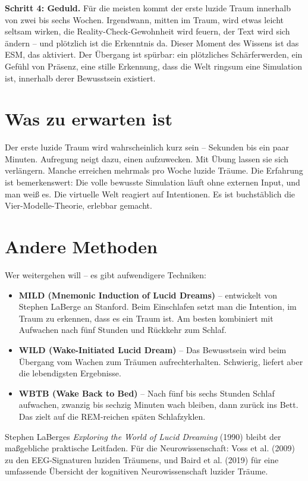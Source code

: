 \documentclass[11pt, twoside, openright]{book}
\begin{document}
\textbf{Schritt 4: Geduld.} Für die meisten kommt der erste luzide Traum innerhalb von zwei bis sechs Wochen. Irgendwann, mitten im Traum, wird etwas leicht seltsam wirken, die Reality-Check-Gewohnheit wird feuern, der Text wird sich ändern -- und plötzlich ist die Erkenntnis da. Dieser Moment des Wissens ist das ESM, das aktiviert. Der Übergang ist spürbar: ein plötzliches Schärferwerden, ein Gefühl von Präsenz, eine stille Erkennung, dass die Welt ringsum eine Simulation ist, innerhalb derer Bewusstsein existiert.

\section*{Was zu erwarten ist}

Der erste luzide Traum wird wahrscheinlich kurz sein -- Sekunden bis ein paar Minuten. Aufregung neigt dazu, einen aufzuwecken. Mit Übung lassen sie sich verlängern. Manche erreichen mehrmals pro Woche luzide Träume. Die Erfahrung ist bemerkenswert: Die volle bewusste Simulation läuft ohne externen Input, und man weiß es. Die virtuelle Welt reagiert auf Intentionen. Es ist buchstäblich die Vier-Modelle-Theorie, erlebbar gemacht.

\section*{Andere Methoden}

Wer weitergehen will -- es gibt aufwendigere Techniken:

\begin{itemize}
  \item \textbf{MILD (Mnemonic Induction of Lucid Dreams)} -- entwickelt von Stephen LaBerge an Stanford. Beim Einschlafen setzt man die Intention, im Traum zu erkennen, dass es ein Traum ist. Am besten kombiniert mit Aufwachen nach fünf Stunden und Rückkehr zum Schlaf.
  \item \textbf{WILD (Wake-Initiated Lucid Dream)} -- Das Bewusstsein wird beim Übergang vom Wachen zum Träumen aufrechterhalten. Schwierig, liefert aber die lebendigsten Ergebnisse.
  \item \textbf{WBTB (Wake Back to Bed)} -- Nach fünf bis sechs Stunden Schlaf aufwachen, zwanzig bis sechzig Minuten wach bleiben, dann zurück ins Bett. Das zielt auf die REM-reichen späten Schlafzyklen.
\end{itemize}

Stephen LaBerges \textit{Exploring the World of Lucid Dreaming} (1990) bleibt der maßgebliche praktische Leitfaden. Für die Neurowissenschaft: Voss et al. (2009) zu den EEG-Signaturen luziden Träumens, und Baird et al. (2019) für eine umfassende Übersicht der kognitiven Neurowissenschaft luzider Träume.
\end{document}
